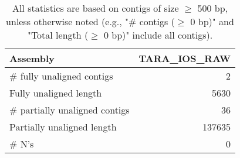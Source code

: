 \documentclass[12pt,a4paper]{article}
\begin{document}
\begin{table}[ht]
\begin{center}
\caption{All statistics are based on contigs of size $\geq$ 500 bp, unless otherwise noted (e.g., "\# contigs ($\geq$ 0 bp)" and "Total length ($\geq$ 0 bp)" include all contigs).}
\begin{tabular}{|l*{1}{|r}|}
\hline
Assembly & TARA\_IOS\_RAW \\ \hline
\# fully unaligned contigs & 2 \\ \hline
Fully unaligned length & 5630 \\ \hline
\# partially unaligned contigs & 36 \\ \hline
Partially unaligned length & 137635 \\ \hline
\# N's & 0 \\ \hline
\end{tabular}
\end{center}
\end{table}
\end{document}
